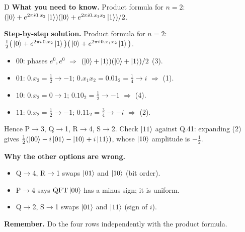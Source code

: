 \documentclass[11pt,a4paper]{article}
\newcommand{\qsep}{\par\vspace{2pt}{\color{black!15}\hrule}\vspace{4pt}}
\newcommand{\QFTop}{\mathrm{QFT}}
\begin{document}
\begin{solbox}{D}
\textbf{\color{brand}What you need to know.} Product formula for $n = 2$: $(\ket0 + e^{2\pi i0.x_2}\ket1)(\ket0 + e^{2\pi i0.x_1x_2}\ket1)/2$.

\textbf{\color{brand}Step-by-step solution.} Product formula for $n = 2$: $\frac12\big(\ket0 + e^{2\pi i\,0.x_2}\ket1\big)\big(\ket0 + e^{2\pi i\,0.x_1x_2}\ket1\big)$.
\begin{itemize}\itemsep0pt
\item $00$: phases $e^0, e^0$ $\Rightarrow$ $(\ket0 + \ket1)(\ket0 + \ket1)/2$ (3).
\item $01$: $0.x_2 = \frac12 \to -1$; $0.x_1x_2 = 0.01_2 = \frac14 \to i$ $\Rightarrow$ (1).
\item $10$: $0.x_2 = 0 \to 1$; $0.10_2 = \frac12 \to -1$ $\Rightarrow$ (4).
\item $11$: $0.x_2 = \frac12 \to -1$; $0.11_2 = \frac34 \to -i$ $\Rightarrow$ (2).
\end{itemize}
Hence P$\to$3, Q$\to$1, R$\to$4, S$\to$2. Check $\ket{11}$ against Q.41: expanding (2) gives $\frac12(\ket{00} - i\ket{01} - \ket{10} + i\ket{11})$,
whose $\ket{10}$ amplitude is $-\frac12$.

\textbf{\color{brand}Why the other options are wrong.}
\begin{itemize}[leftmargin=2.4em, itemsep=1pt, topsep=2pt]
\item[\textbf{(A)}] Q$\to$4, R$\to$1 swaps $\ket{01}$ and $\ket{10}$ (bit order).
\item[\textbf{(B)}] P$\to$4 says $\QFTop\ket{00}$ has a minus sign; it is uniform.
\item[\textbf{(C)}] Q$\to$2, S$\to$1 swaps $\ket{01}$ and $\ket{11}$ (sign of $i$).
\end{itemize}
\textbf{\color{brand}Remember.} Do the four rows independently with the product formula.
\end{solbox}
\qsep
\end{document}
